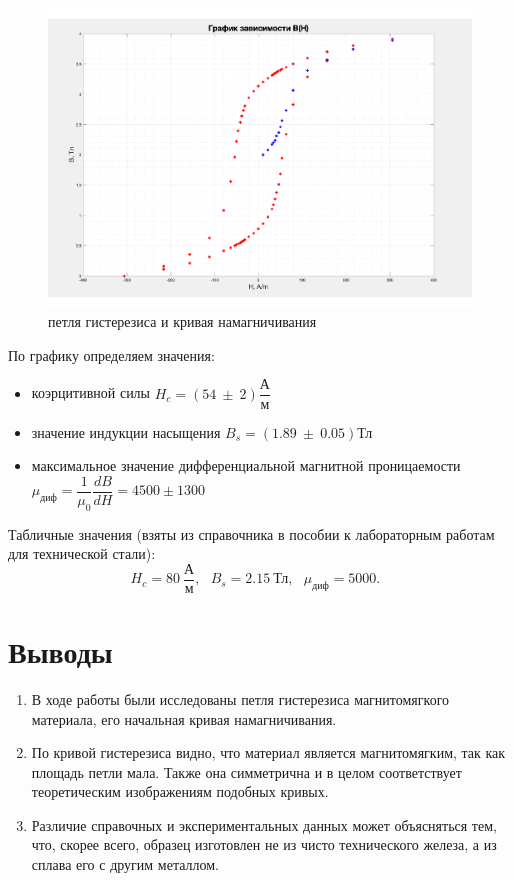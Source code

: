 \documentclass[a4paper,14pt]{article}
\begin{document}
\begin{center}
\begin{figure}[bhtp]
	\centering
	\includegraphics[width=\linewidth]{gra1.pdf}
	\caption{петля гистерезиса и кривая намагничивания}
	\label{gr1}
\end{figure}
\end{center}

По графику определяем значения:
\begin{itemize}
\item коэрцитивной силы $H_c = (54 \ \pm \ 2) \dfrac{\text{А}}{\text{м}}$
\item значение индукции насыщения $B_s = (1.89 \ \pm \ 0.05) \text{Тл}$
\item максимальное значение дифференциальной магнитной проницаемости $\mu_\text{диф} = \dfrac{1}{\mu_0} \dfrac{dB}{dH} = 4500 \pm 1300$
\end{itemize}

Табличные значения (взяты из справочника в пособии к лабораторным работам для технической стали): \[
H_c = 80 \ \dfrac{\text{А}}{\text{м}}, \ \ \
B_s = 2.15 \ \text{Тл}, \ \ \
\mu_\text{диф} = 5000. \ \ \
\]


\section*{Выводы}

\begin{enumerate}
	\item В ходе работы были исследованы петля гистерезиса магнитомягкого материала, его начальная кривая намагничивания.
	\item По кривой гистерезиса видно, что материал является магнитомягким, так как площадь петли мала. Также она симметрична и в целом соответствует теоретическим изображениям подобных кривых.
	\item Различие справочных и экспериментальных данных может объясняться тем, что, скорее всего, образец изготовлен не из чисто технического железа, а из сплава его с другим металлом.
\end{enumerate}
\end{document}
